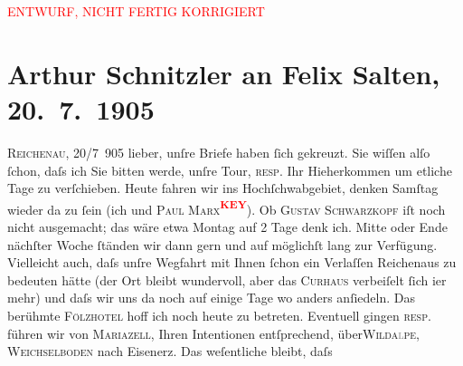 
\begin{center}
            \textcolor{red}{ENTWURF, NICHT FERTIG KORRIGIERT}
                      \end{center}
            
         
         \renewcommand{\erwaehntePersonen}{Personen: Hermann Bahr, Felix Salten, Paul Salten, Gustav Schwarzkopf}
         \renewcommand{\erwaehnteOrte}{Orte: Eisenerz, Hochschwab, Hotel Hochschwab, Kurhaus Rudolfsbad, Mariazell, Reichenau an der Rax, Weichselboden, Wien, Wildalpen}
         \renewcommand{\erwaehnteWerke}{}
               \section[Arthur Schnitzler an Felix Salten, 20. 7. 1905]{ Arthur Schnitzler an Felix Salten, 20. 7. 1905}\nopagebreak{}\rehead{ }\begin{ledgroupsized}[t]{13cm}\normalsize\beginnumbering \toendnotes[C]{\smallbreak\pagebreak[2]} 
\toendnotes[C]{\smallbreak}\pstart
           \raggedleft{}{\pb}\textsc{Reichenau}, 20/7 905\pend
           \pstart
           lieber, unſre Briefe haben ſich gekreuzt. Sie wiſſen alſo ſchon,
               daſs ich Sie bitten werde, unſre Tour, \textsc{resp.} Ihr
               Hieherkommen um etliche Tage zu verſchieben. Heute fahren wir ins Hochſchwabgebiet, denken Samſtag wieder da zu
               ſein (ich und \textsc{Paul Marx\textcolor{red}{\textsuperscript{\textbf{KEY}}}}). Ob \textsc{Gustav Schwarzkopf} iſt noch nicht ausgemacht; das wäre etwa Montag auf 2 Tage denk ich. Mitte {\pb}oder Ende nächſter Woche ſtänden
               wir dann gern und auf möglichſt lang zur Verfügung. Vielleicht auch, daſs unſre
               Wegfahrt mit Ihnen ſchon ein Verlaſſen Reichenaus
               zu bedeuten hätte (der Ort bleibt wundervoll, aber das \textsc{Curhaus} verbeiſelt ſich i{\geminationm}er mehr) und daſs wir uns da{\geminationn} noch auf einige Tage wo anders anſiedeln. Das berühmte
               {\pb}\textsc{Fölzhotel} hoff ich noch heute zu betreten. Eventuell gingen \textsc{resp.} führen wir von \textsc{Mariazell}, Ihren Intentionen entſprechend, über\textsc{Wilda\textcolor{gray}{l}pe}, \textsc{Weichselboden} nach Eisenerz. Das weſentliche bleibt, daſs

\end{ledgroupsized}
